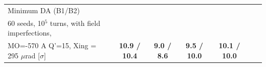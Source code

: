 \documentclass{cernatsnote}
\begin{document}
\begin{landscape}
\begin{table}[h!]
\begin{center}
\begin{tabular}{|l|c|c|c|c|c|c|}
Minimum DA (B1/B2)  &               &            &           &                    \\
60 seeds, 10$^{5}$ turns, with field imperfections,  &               &            &           &                    \\
 MO=-570 A  Q'=15, Xing = 295 $\mu$rad [$\sigma$]  &    \textbf{ 10.9 / 10.4}          &    \textbf{9.0 / 8.6}       &    \textbf{ 9.5 / 10.0}       &      \textbf{10.1 / 10.0}         \\ \hline


\end{tabular}
\end{center}
\end{table}
\end{landscape}
\end{document}
